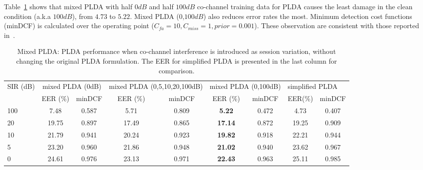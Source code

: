 Table~\ref{tbl:mixed_plda} shows that mixed PLDA with half $0dB$ and half $100dB$ co-channel training data for PLDA causes the least damage in the clean condition (a.k.a $100dB$), from $4.73$ to $5.22$. Mixed PLDA ($0$,$100dB$) also reduces error rates the most. 
Minimum detection cost functions (minDCF) is calculated over the operating point ($C_{fa}=10, C_{miss}=1, prior = 0.001$). 
These observation are consistent with those reported in~\cite{shokouhi2015probabilistic}. 

\begin{table}[t!]
	\small
	\centering
	\resizebox{\textwidth}{!}
	{
		\begin{tabular}{|l|c|c|c|c|c|c|c|c|c|c|c|}
		\hline
		\multirow{2}{*}{SIR (dB)} & \multicolumn{3}{c|}{mixed PLDA (0dB)}          & \multicolumn{3}{c|}{mixed PLDA (0,5,10,20,100dB)}  & \multicolumn{3}{c|}{mixed PLDA (0,100dB)}       & \multicolumn{2}{l|}{simplified PLDA} \\ \cline{2-12} 
		& \multicolumn{2}{r|}{EER (\%)} & minDCF         & \multicolumn{2}{c|}{EER (\%)} & minDCF             & \multicolumn{2}{c|}{EER (\%)} & minDCF          & EER(\%)           & minDCF           \\ \hline
		100                       & \multicolumn{2}{c|}{7.48}     & 0.587          & \multicolumn{2}{c|}{5.71}     & 0.809              & \multicolumn{2}{c|}{\bf 5.22}     & 0.472           & 4.73              & 0.407            \\ \hline
		20                        & \multicolumn{2}{c|}{19.75}    & 0.897          & \multicolumn{2}{c|}{17.49}    & 0.865              & \multicolumn{2}{c|}{\bf 17.14}    & 0.872           & 19.25             & 0.909            \\ \hline
		10                        & \multicolumn{2}{c|}{21.79}    & 0.941          & \multicolumn{2}{c|}{20.24}    & 0.923              & \multicolumn{2}{c|}{\bf 19.82}    & 0.918           & 22.21             & 0.944            \\ \hline
		5                         & \multicolumn{2}{c|}{23.20}    & 0.960          & \multicolumn{2}{c|}{21.86}    & 0.948              & \multicolumn{2}{c|}{\bf 21.02}    & 0.940           & 23.62             & 0.967            \\ \hline
		0                         & \multicolumn{2}{c|}{24.61}    & 0.976          & \multicolumn{2}{c|}{23.13}    & 0.971              & \multicolumn{2}{c|}{\bf 22.43}    & 0.963           & 25.11             & 0.985            \\ \hline
	\end{tabular}
	}
	\caption{Mixed PLDA: PLDA performance when co-channel interference is introduced as session variation, without changing the original PLDA formulation. The EER for simplified PLDA is presented in the last column for comparison. }
	\label{tbl:mixed_plda}
\end{table}

